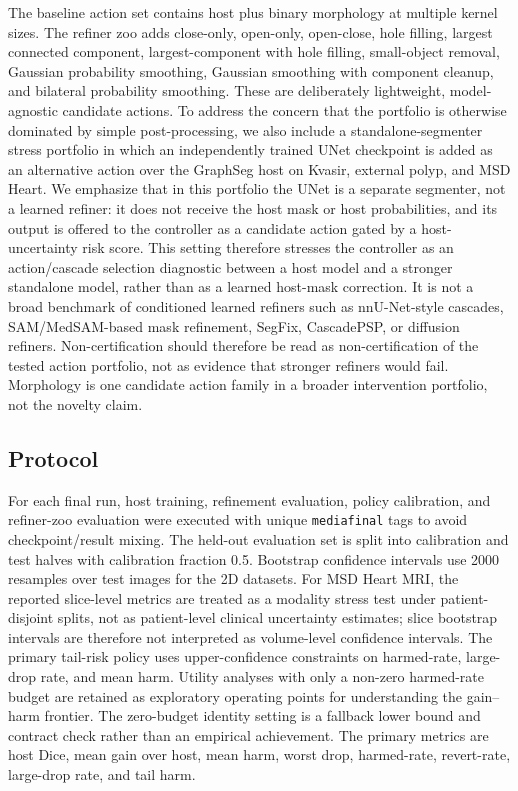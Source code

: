 \documentclass[preprint,12pt]{elsarticle}
\begin{document}
The baseline action set contains host plus binary morphology at multiple kernel
sizes. The refiner zoo adds close-only, open-only, open-close, hole filling,
largest connected component, largest-component with hole filling, small-object
removal, Gaussian probability smoothing, Gaussian smoothing with component
cleanup, and bilateral probability smoothing. These are deliberately
lightweight, model-agnostic candidate actions. To address the concern that the
portfolio is otherwise dominated by simple post-processing, we also include a
standalone-segmenter stress portfolio in which an independently trained UNet
checkpoint is added as an alternative action over the GraphSeg host on Kvasir,
external polyp, and MSD Heart. We emphasize that in this portfolio the UNet is a
separate segmenter, not a learned refiner: it does not receive the host mask or
host probabilities, and its output is offered to the controller as a candidate
action gated by a host-uncertainty risk score. This setting therefore stresses
the controller as an action/cascade selection diagnostic between a host model
and a stronger standalone model, rather than as a learned host-mask correction.
It is not a broad benchmark of conditioned learned refiners such as
nnU-Net-style cascades, SAM/MedSAM-based mask refinement, SegFix, CascadePSP, or
diffusion refiners. Non-certification should therefore be read as
non-certification of the tested action portfolio, not as evidence that stronger
refiners would fail. Morphology is one candidate action family in a broader
intervention portfolio, not the novelty claim.

\subsection{Protocol}

For each final run, host training, refinement evaluation, policy calibration,
and refiner-zoo evaluation were executed with unique \texttt{mediafinal} tags
to avoid checkpoint/result mixing. The held-out evaluation set is split into
calibration and test halves with calibration fraction 0.5. Bootstrap confidence
intervals use 2000 resamples over test images for the 2D datasets. For MSD
Heart MRI, the reported slice-level metrics are treated as a modality stress
test under patient-disjoint splits, not as patient-level clinical uncertainty
estimates; slice bootstrap intervals are therefore not interpreted as
volume-level confidence intervals. The primary tail-risk policy uses
upper-confidence constraints on harmed-rate, large-drop rate, and mean harm.
Utility analyses with only a non-zero harmed-rate budget are retained as
exploratory operating points for understanding the gain--harm frontier. The
zero-budget identity setting is a fallback lower bound and contract check rather
than an empirical achievement. The primary metrics are host Dice, mean gain over
host, mean harm, worst drop, harmed-rate, revert-rate, large-drop rate, and tail
harm.
\end{document}
